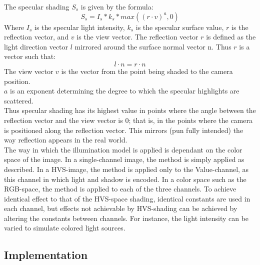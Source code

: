 The specular shading $S_s$ is given by the formula:
\begin{equation}
	S_s = I_s * k_s * max((r \cdot v) ^ a, 0)
\end{equation}
Where $I_s$ is the specular light intensity, $k_s$ is the specular surface value, $r$ is the reflection vector, and $v$ is the view vector. The reflection vector $r$ is defined as the light direction vector $l$ mirrored around the surface normal vector n. Thus $r$ is a vector such that:
\begin{equation}
	l \cdot n = r \cdot n
\end{equation}
The view vector $v$ is the vector from the point being shaded to the camera position. \\
$a$ is an exponent determining the degree to which the specular highlights are scattered. \\
Thus specular shading has its highest value in points where the angle between the reflection vector and the view vector is 0; that is, in the points where the camera is positioned along the reflection vector. This mirrors (pun fully intended) the way reflection appears in the real world. \\
The way in which the illumination model is applied is dependant on the color space of the image. In a single-channel image, the method is simply applied as described. In a HVS-image, the method is applied only to the Value-channel, as this channel in which light and shadow is encoded. In a color space such as the RGB-space, the method is applied to each of the three channels. To achieve identical effect to that of the HVS-space shading, identical constants are used in each channel, but effects not achievable by HVS-shading can be achieved by altering the constants between channels. For instance, the light intensity can be varied to simulate colored light sources.

\subsection{Implementation}

